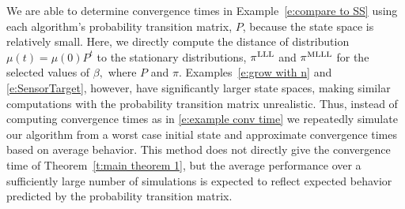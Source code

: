 We are able to determine convergence times in Example~\ref{e:compare to SS} using each algorithm's probability transition matrix, $P$, because the state space is relatively small. Here, we directly compute the distance of distribution $\mu(t) = \mu(0)P^t$ to the stationary distributions, $\pi^{\rm LLL}$ and $\pi^{\rm MLLL}$ for the selected values of $\beta,$ where $P$ and $\pi$.  
Examples~\ref{e:grow with n} and \ref{e:SensorTarget}, however, have significantly larger state spaces, making similar computations with the probability transition matrix unrealistic. Thus, instead of computing convergence times as in \eqref{e:example conv time} we repeatedly simulate our algorithm from a worst case initial state and approximate convergence times based on average behavior. This method does not directly give the convergence time of Theorem~\ref{t:main theorem 1}, but the average performance over a sufficiently large number of simulations is expected to reflect expected behavior predicted by the probability transition matrix.


